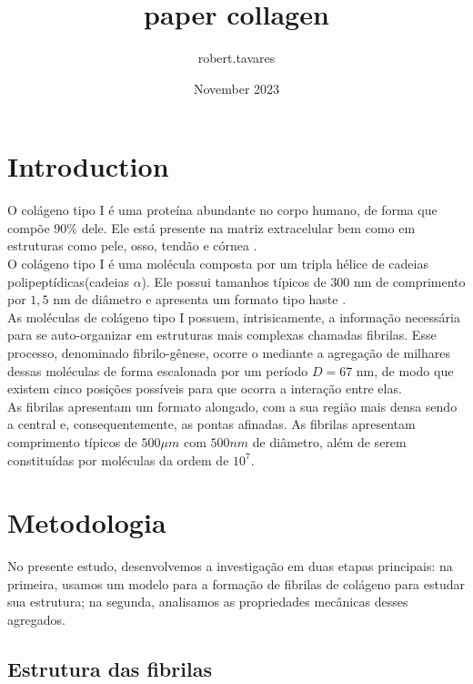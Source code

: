 \documentclass{article}
\title{paper collagen}
\author{robert.tavares}
\date{November 2023}
\begin{document}
\maketitle

\section{Introduction}

O colágeno tipo I é uma proteína abundante no corpo humano, de forma que compõe $90\%$ dele. Ele está presente na matriz extracelular bem como em estruturas como pele, osso, tendão e córnea \cite{RicoLlanos2021, Silver2018}.
\\

O colágeno tipo I é uma molécula composta por um tripla hélice de cadeias polipeptídicas(cadeias $\alpha$). Ele possui tamanhos típicos de $300$ nm de comprimento por $1,5$ nm de diâmetro e apresenta um formato tipo haste \cite{Gelse2003,Silver2018}. 
\\

As moléculas de colágeno tipo I possuem, intrisicamente, a informação necessária para se auto-organizar em estruturas mais complexas chamadas fibrilas. Esse processo, denominado fibrilo-gênese, ocorre o mediante a agregação de milhares dessas moléculas de forma escalonada por um período $D= 67$ nm, de modo que existem cinco posições possíveis para que ocorra a interação entre elas\cite{Zhu2018, KADLER1996}.  
\\

As fibrilas apresentam um formato alongado, com a sua região mais densa sendo a central e, consequentemente, as pontas afinadas\cite{Charvolin2019, KADLER1996}. As fibrilas apresentam comprimento típicos de $500 \mu m$ com $500 nm$ de diâmetro, além de serem constituídas por moléculas da ordem de $10^{7}$\cite{Parry1984}. 
\\


\section{Metodologia}

    No presente estudo, desenvolvemos a investigação em duas etapas principais: na primeira, usamos um modelo para a formação de 
    fibrilas de colágeno para estudar sua estrutura; na segunda, analisamos as propriedades mecânicas desses agregados. 

    \subsection{Estrutura das fibrilas}
\end{document}
